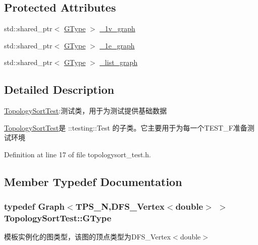 \subsection*{Protected Attributes}
\begin{DoxyCompactItemize}
\item 
std\+::shared\+\_\+ptr$<$ \hyperlink{class_topology_sort_test_aa530f6f774d1b97dbb3968d9e445ce21}{G\+Type} $>$ \hyperlink{class_topology_sort_test_a087401853f564307534465e2ac59c0ef}{\+\_\+1v\+\_\+graph}
\item 
std\+::shared\+\_\+ptr$<$ \hyperlink{class_topology_sort_test_aa530f6f774d1b97dbb3968d9e445ce21}{G\+Type} $>$ \hyperlink{class_topology_sort_test_af1fe553500cfb175b236a0302d9044af}{\+\_\+1e\+\_\+graph}
\item 
std\+::shared\+\_\+ptr$<$ \hyperlink{class_topology_sort_test_aa530f6f774d1b97dbb3968d9e445ce21}{G\+Type} $>$ \hyperlink{class_topology_sort_test_ac664dd33d2aa257a993c1835caa0d5ad}{\+\_\+list\+\_\+graph}
\end{DoxyCompactItemize}


\subsection{Detailed Description}
\hyperlink{class_topology_sort_test}{Topology\+Sort\+Test}\+:测试类，用于为测试提供基础数据 

{\ttfamily \hyperlink{class_topology_sort_test}{Topology\+Sort\+Test}}是 {\ttfamily \+::testing\+::\+Test} 的子类。它主要用于为每一个{\ttfamily T\+E\+S\+T\+\_\+\+F}准备测试环境 

Definition at line 17 of file topologysort\+\_\+test.\+h.



\subsection{Member Typedef Documentation}
\hypertarget{class_topology_sort_test_aa530f6f774d1b97dbb3968d9e445ce21}{}
\subsubsection[{G\+Type}]{\setlength{\rightskip}{0pt plus 5cm}typedef {\bf Graph}$<${\bf T\+P\+S\+\_\+\+N},{\bf D\+F\+S\+\_\+\+Vertex}$<$double$>$ $>$ {\bf Topology\+Sort\+Test\+::\+G\+Type}}\label{class_topology_sort_test_aa530f6f774d1b97dbb3968d9e445ce21}
模板实例化的图类型，该图的顶点类型为{\ttfamily D\+F\+S\+\_\+\+Vertex$<$double$>$} 

